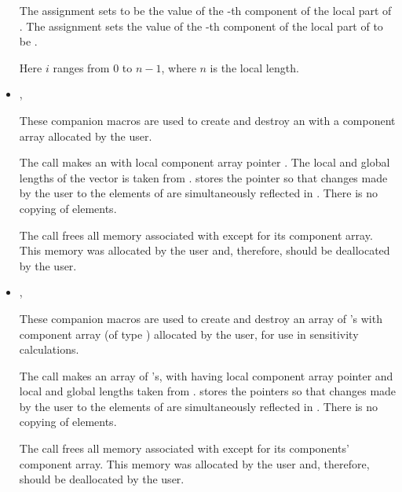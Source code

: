 \begin{itemize}
      The assignment  sets  to be the value of 
      the -th component of the local part of . 
      The assignment    
      sets the value of the -th component of the local part of  
      to be .        

      Here $i$ ranges from $0$ to $n-1$, where $n$ is the local length.

\item {}, 

      These companion macros are used to create and          
      destroy an  with a component array         
      allocated by the user.                                   
                                                               
      The call  makes  an        
       with local component array pointer . 
      The local and global lengths of the  
      vector  is taken from .                             
       stores the pointer  so that changes      
      made by the user to the elements of  are           
      simultaneously reflected in . There is no copying of    
      elements.                                                
                                                               
      The call  frees all memory associated     
      with  except for its component array. This memory was   
      allocated by the user and, therefore, should be          
      deallocated by the user.   

\item {}, 
                             
      These companion macros are used to create and destroy  
      an array of 's with component array  
      (of type ) allocated by the user, for use
      in sensitivity calculations.
                                                               
      The call  makes   
       an array of  's, with  having
      local component array pointer  and local and global lengths taken 
      from .    
       stores the pointers  so that        
      changes made by the user to the elements of  are  
      simultaneously reflected in . There is no copying of   
      elements.                                                
                                                               
      The call  frees all memory associated   
      with  except for its components' component array.      
      This memory was allocated by the user and, therefore,    
      should be deallocated by the user.                       

\end{itemize}

